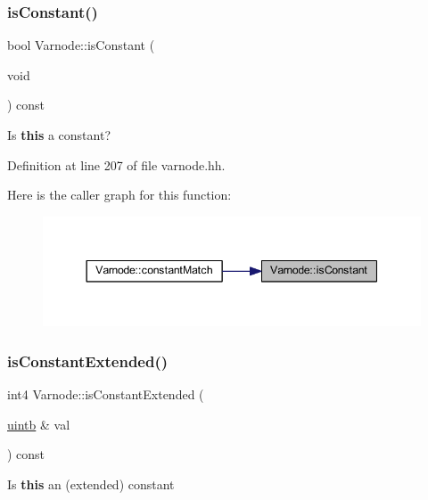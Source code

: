 \subsubsection{\texorpdfstring{isConstant()}{isConstant()}}
{\footnotesize\ttfamily bool Varnode\+::is\+Constant (\begin{DoxyParamCaption}\item[{void}]{ }\end{DoxyParamCaption}) const\hspace{0.3cm}{\ttfamily [inline]}}



Is {\bfseries{this}} a constant? 



Definition at line 207 of file varnode.\+hh.

Here is the caller graph for this function\+:
\nopagebreak
\begin{figure}[H]
\begin{center}
\leavevmode
\includegraphics[width=344pt]{class_varnode_a11850c09d941e033fc0203673335a861_icgraph}
\end{center}
\end{figure}
\mbox{\label{class_varnode_ab6a24df6723e760e4fa32e2cbad8b6df}} 
\subsubsection{\texorpdfstring{isConstantExtended()}{isConstantExtended()}}
{\footnotesize\ttfamily int4 Varnode\+::is\+Constant\+Extended (\begin{DoxyParamCaption}\item[{\mbox{\hyperlink{types_8h_a2db313c5d32a12b01d26ac9b3bca178f}{uintb}} \&}]{val }\end{DoxyParamCaption}) const}

Is {\bfseries{this}} an (extended) constant

